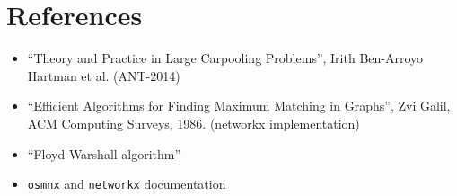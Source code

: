 \documentclass[main.tex]{subfiles}
\begin{document}
\section{References}
\begin{itemize}
  \item ``Theory and Practice in Large Carpooling Problems'', Irith Ben-Arroyo
    Hartman et al. (ANT-2014)
  \item ``Efficient Algorithms for Finding Maximum Matching in Graphs'', Zvi
    Galil, ACM Computing Surveys, 1986. (networkx implementation)
  \item ``Floyd-Warshall algorithm''
  \item \texttt{osmnx} and \texttt{networkx} documentation
\end{itemize}
\end{document}
